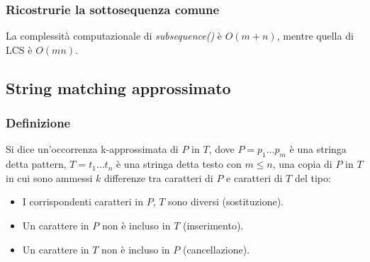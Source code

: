 \subsubsection{Ricostrurie la sottosequenza comune}
\begin{algorithm}[H]
\DontPrintSemicolon
{}





\SetKwFunction{}{}
\SetKwFunction{}{}

\caption{}
\Item[]\Space{}

\Item[]\Space{}

\end{algorithm}
La complessit\`a computazionale di \emph{subsequence()} \`e $O(m+n)$, mentre quella di LCS \`e $O(mn)$. 
\subsection{String matching approssimato}
\subsubsection{Definizione}
Si dice un'occorrenza k-approssimata di $P$ in $T$, dove $P=p_1\dots p_m$ \`e una stringa detta pattern, $T=t_1\dots t_n$ \`e una stringa detta testo con $m\le n$, una copia di $P$ in 
$T$ in cui sono ammessi $k$ differenze tra caratteri di $P$ e caratteri di $T$ del tipo:
\begin{itemize}
	\item I corrispondenti caratteri in $P$, $T$ sono diversi (sostituzione).
	\item Un carattere in $P$ non \`e incluso in $T$ (inserimento).
	\item Un carattere in $T$ non \`e incluso in $P$ (cancellazione).
\end{itemize}
